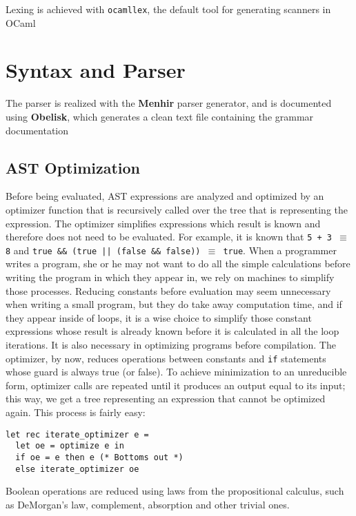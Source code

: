 \documentclass[a4paper, 10pt]{article}
\theoremstyle{plain}%
\theoremstyle{definition}
\theoremstyle{remark}
\begin{document}
Lexing is achieved with \texttt{ocamllex}, the default tool for generating
scanners in OCaml

\section{Syntax and Parser}
The parser is realized with the \textbf{Menhir} parser generator, and is
documented using \textbf{Obelisk}, which generates a clean text file
containing the grammar documentation



\begin{multicols}{2}

\section{AST Optimization}
Before being evaluated, AST expressions are analyzed and optimized by an
optimizer function that is recursively called over the tree that is representing
the expression. The optimizer simplifies expressions which result is known and
therefore does not need to be evaluated. For example, it is known that \texttt{5
+ 3 $\equiv$ 8} and \texttt{true \&\& (true || (false \&\& false)) $\equiv$
true}. When a programmer writes a program, she or he may not want to do all the
simple calculations before writing the program in which they appear in, we rely
on machines to simplify those processes. Reducing constants before evaluation
may seem unnecessary when writing a small program, but they do take away
computation time, and if they appear inside of loops, it is a wise choice to
simplify those constant expressions whose result is already known before it is
calculated in all the loop iterations. It is also necessary in optimizing
programs before compilation. The optimizer, by now, reduces operations between
constants and \texttt{if} statements whose guard is always true (or false). To
achieve minimization to an unreducible form, optimizer calls are repeated until
it produces an output equal to its input; this way, we get a tree representing
an expression that cannot be optimized again. This process is fairly easy:

\begin{lstlisting}[style=caml]
let rec iterate_optimizer e =
  let oe = optimize e in
  if oe = e then e (* Bottoms out *)
  else iterate_optimizer oe
\end{lstlisting}

Boolean operations are reduced using laws from the propositional calculus, such as DeMorgan's law, complement, absorption and other trivial ones.


\end{multicols}
\end{document}
